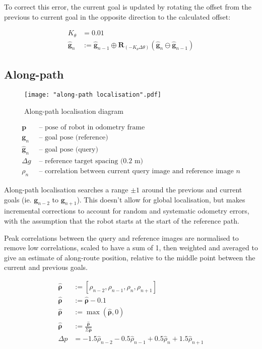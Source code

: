 \documentclass{article}
\begin{document}
To correct this error, the current goal is updated by rotating the offset from the previous to current goal in the opposite direction to the calculated offset:

\begin{align*}
	K_\theta &= 0.01 \\
	\boldsymbol{\hat g}_n &:= \boldsymbol{\hat g}_{n-1} \oplus \boldsymbol{R}_{(-K_\theta\Delta\theta)}(\boldsymbol{\hat g}_n \ominus \boldsymbol{\hat g}_{n-1})
\end{align*}

\subsection{Along-path}

\begin{figure}[ht]
	\centering
	\texttt{[image: "along-path localisation".pdf]}
	\caption{Along-path localisation diagram}
\end{figure}

\begin{align*}
	\boldsymbol{p} & \text{ -- pose of robot in odometry frame} \\
	\boldsymbol{g}_n & \text{ -- goal pose (reference)} \\
	\boldsymbol{\hat g}_n & \text{ -- goal pose (query)} \\
	\Delta g & \text{ -- reference target spacing (0.2 m)} \\
	\rho_n & \text{ -- correlation between current query image and reference image } n
\end{align*}

Along-path localisation searches a range $\pm 1$ around the previous and current goals (ie. $\boldsymbol{g}_{n-2}$ to $\boldsymbol{g}_{n+1}$). This doesn't allow for global localisation, but makes incremental corrections to account for random and systematic odometry errors, with the assumption that the robot starts at the start of the reference path.

Peak correlations between the query and reference images are normalised to remove low correlations, scaled to have a sum of 1, then weighted and averaged to give an estimate of along-route position, relative to the middle point between the current and previous goals.

\begin{align*}
	\boldsymbol{\hat\rho} &:= [\rho_{n-2}, \rho_{n-1}, \rho_n, \rho_{n+1}] \\
	\boldsymbol{\hat\rho} &:= \boldsymbol{\hat\rho} - 0.1 \\
	\boldsymbol{\hat\rho} &:= \max(\boldsymbol{\hat\rho}, 0) \\
	\boldsymbol{\hat\rho} &:= \frac{\boldsymbol{\hat\rho}}{\Sigma\boldsymbol{\hat\rho}} \\
	\Delta p &= -1.5\hat\rho_{n-2} - 0.5 \hat\rho_{n-1} + 0.5\hat\rho_{n} + 1.5\hat\rho_{n+1}
\end{align*}
\end{document}
